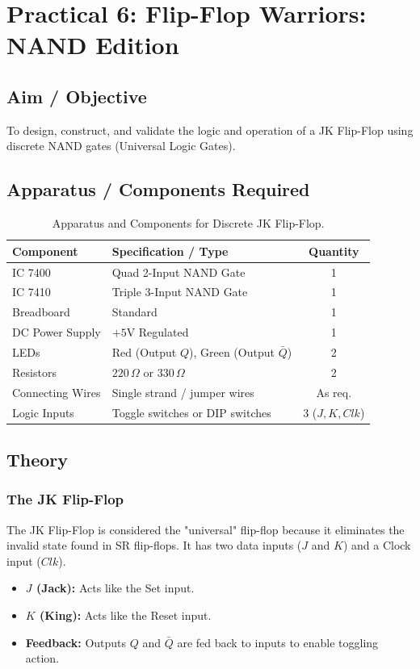 \chapter{Practical 6: Flip-Flop Warriors: NAND Edition}

\section{Aim / Objective}
To design, construct, and validate the logic and operation of a JK Flip-Flop using discrete NAND gates (Universal Logic Gates).

\section{Apparatus / Components Required}

\begin{table}[htbp]
\centering
\small
\begin{tabularx}{\textwidth}{l X c}
\toprule
\textbf{Component} & \textbf{Specification / Type} & \textbf{Quantity} \\
\midrule
IC 7400 & Quad 2-Input NAND Gate & 1 \\
IC 7410 & Triple 3-Input NAND Gate & 1 \\
Breadboard & Standard & 1 \\
DC Power Supply & $+5\text{V}$ Regulated & 1 \\
LEDs & Red (Output $Q$), Green (Output $\bar{Q}$) & 2 \\
Resistors & $220\,\Omega$ or $330\,\Omega$ & 2 \\
Connecting Wires & Single strand / jumper wires & As req. \\
Logic Inputs & Toggle switches or DIP switches & 3 ($J, K, Clk$) \\
\bottomrule
\end{tabularx}
\caption{Apparatus and Components for Discrete JK Flip-Flop.}
\label{tab:ff-apparatus}
\end{table}

\section{Theory}

\subsection{The JK Flip-Flop}
The JK Flip-Flop is considered the "universal" flip-flop because it eliminates the invalid state found in SR flip-flops. It has two data inputs ($J$ and $K$) and a Clock input ($Clk$).
\begin{itemize}
    \item \textbf{$J$ (Jack):} Acts like the Set input.
    \item \textbf{$K$ (King):} Acts like the Reset input.
    \item \textbf{Feedback:} Outputs $Q$ and $\bar{Q}$ are fed back to inputs to enable toggling action.
\end{itemize}

